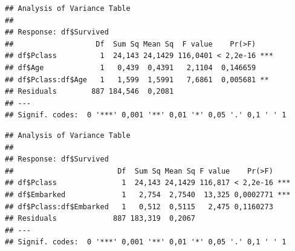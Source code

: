 \documentclass[]{article}
\newenvironment{Shaded}{\begin{snugshade}}{\end{snugshade}}
\newcommand{\KeywordTok}[1]{\textcolor[rgb]{0.13,0.29,0.53}{\textbf{#1}}}
\newcommand{\StringTok}[1]{\textcolor[rgb]{0.31,0.60,0.02}{#1}}
\newcommand{\OperatorTok}[1]{\textcolor[rgb]{0.81,0.36,0.00}{\textbf{#1}}}
\newcommand{\NormalTok}[1]{#1}
\begin{document}
\begin{Shaded}
\end{Shaded}

\begin{verbatim}
## Analysis of Variance Table
## 
## Response: df$Survived
##                   Df  Sum Sq Mean Sq  F value    Pr(>F)    
## df$Pclass          1  24,143 24,1429 116,0401 < 2,2e-16 ***
## df$Age             1   0,439  0,4391   2,1104  0,146659    
## df$Pclass:df$Age   1   1,599  1,5991   7,6861  0,005681 ** 
## Residuals        887 184,546  0,2081                       
## ---
## Signif. codes:  0 '***' 0,001 '**' 0,01 '*' 0,05 '.' 0,1 ' ' 1
\end{verbatim}

\begin{Shaded}
\end{Shaded}

\begin{verbatim}
## Analysis of Variance Table
## 
## Response: df$Survived
##                        Df  Sum Sq Mean Sq F value    Pr(>F)    
## df$Pclass               1  24,143 24,1429 116,817 < 2,2e-16 ***
## df$Embarked             1   2,754  2,7540  13,325 0,0002771 ***
## df$Pclass:df$Embarked   1   0,512  0,5115   2,475 0,1160273    
## Residuals             887 183,319  0,2067                      
## ---
## Signif. codes:  0 '***' 0,001 '**' 0,01 '*' 0,05 '.' 0,1 ' ' 1
\end{verbatim}

\begin{Shaded}
\end{Shaded}
\end{document}
